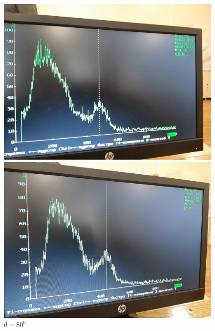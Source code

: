 \documentclass[a4paper, 12pt]{article}
\begin{document}
\begin{figure}[h]
\begin{minipage}[h]{0.3\linewidth}
\includegraphics[width = 1\linewidth]{70.jpg}
\caption{$\theta = 70^0$}
\end{minipage}
\hfill
\begin{minipage}[h]{0.3\linewidth}
\includegraphics[width = 1\linewidth]{80.jpg}
\caption{$\theta = 80^0$}
\end{minipage}
\hfill
\begin{minipage}[h]{0.3\linewidth}

\end{minipage}
\end{figure}
\end{document}
